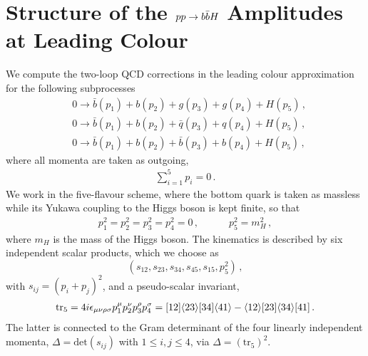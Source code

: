 \documentclass[main.tex]{subfiles}
\begin{document}
\section{Structure of the $pp\to b\bar{b}H$ Amplitudes at Leading Colour}
\label{Hbbsec:amp}

We compute the two-loop QCD corrections in the leading colour approximation for the following subprocesses
\begin{align} \label{eq:subprocesses}
& 0 \rightarrow \bar{b}(p_1) + b(p_2) + g(p_3) + g(p_4) + H(p_5)\,, \\
& 0 \rightarrow \bar{b}(p_1) + b(p_2) + \bar{q}(p_3) + q(p_4) + H(p_5)\,, \\
& 0 \rightarrow \bar{b}(p_1) + b(p_2) + \bar{b}(p_3) + b(p_4) + H(p_5)\,,
\end{align}
where all momenta are taken as outgoing, 
\begin{align}
\sum_{i=1}^5 p_i = 0\,.
\end{align}
We work in the five-flavour scheme, where the bottom quark is taken as massless while its Yukawa coupling to the Higgs boson is kept finite, so that
\begin{align}
p_1^2=p_2^2=p_3^2=p_4^2=0\,, \qquad \quad p_5^2=m_H^2\,, 
\end{align}
where $m_H$ is the mass of the Higgs boson. The kinematics is described by six independent scalar products, which we choose as 
\begin{equation}
 (s_{12},s_{23},s_{34},s_{45},s_{15},p_5^2) \,, \nonumber
\end{equation} with $s_{ij} = (p_i + p_j)^2$, and a pseudo-scalar invariant,
\begin{align}
\text{tr}_5 = 4 i \epsilon_{\mu \nu \rho \sigma} p_1^{\mu} p_2^{\nu} p_3^{\rho} p_4^{\sigma} = [12] \langle23\rangle [34] \langle41\rangle - \langle12\rangle [23] \langle34\rangle [41] \,.
\end{align}
The latter is connected to the Gram determinant of the four linearly independent momenta, $\Delta = \mathrm{det}(s_{ij})$ with $1 \leq i,j \leq 4$, via 
$\Delta = (\text{tr}_5)^2$.
 
\end{document}
